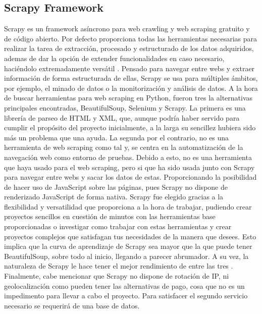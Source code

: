 \subsection{Scrapy Framework}
Scrapy es un framework asíncrono para web crawling y web scraping gratuito y de código abierto. Por defecto proporciona todas las herramientas necesarias para realizar la tarea de extracción, procesado y estructurado de los datos adquiridos, ademas de dar la opción de extender funcionalidades en caso necesario, haciéndolo extremadamente versátil \cite{yang2019design}.
\newline
\newline
Pensado para navegar entre webs y extraer información de forma estructurada de ellas, Scrapy se usa para múltiples ámbitos, por ejemplo, el minado de datos o la monitorización y análisis de datos.\newline
\newline
A la hora de buscar herramientas para web scraping en Python, fueron tres la alternativas principales encontradas, BeautifulSoup, Selenium y Scrapy.
\newline
\newline
La primera es una librería de parseo de HTML y XML, que, aunque podría haber servido para cumplir el propósito del proyecto inicialmente, a la larga su sencillez hubiera sido más un problema que una ayuda.
\newline
\newline
La segunda por el contrario, no es una herramienta de web scraping como tal y, se centra en la automatización de la navegación web como entorno de pruebas. Debido a esto, no es una herramienta que haya usado para el web scraping, pero si que ha sido usada junto con Scrapy para navegar entre webs y sacar los datos de estas. Proporcionando la posibilidad de hacer uso de JavaScript sobre las páginas, pues Scrapy no dispone de renderizado JavaScript de forma nativa.
\newline
\newline
Scrapy fue elegido gracias a la flexibilidad y versatilidad que proporciona a la hora de trabajar, pudiendo crear proyectos sencillos en cuestión de minutos con las herramientas base proporcionadas o investigar como trabajar con estas herramientas y crear proyectos complejos que satisfagan tus necesidades de la manera que desees. Esto implica que la curva de aprendizaje de Scrapy sea mayor que la que puede tener BeautifulSoup, sobre todo al inicio, llegando a parecer abrumador. A su vez, la naturaleza de Scrapy le hace tener el mejor rendimiento de entre las tres \cite{glez2014web}.
\newline
\newline
Finalmente, cabe mencionar que Scrapy no dispone de rotación de IP, ni geolocalización como pueden tener las alternativas de pago, cosa que no es un impedimento para llevar a cabo el proyecto.\newline
\newline
Para satisfacer el segundo servicio necesario se requerirá de una base de datos.

